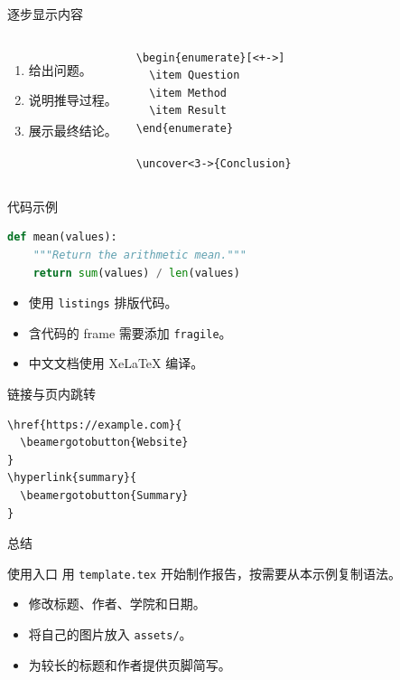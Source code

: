\documentclass{beamer}
\begin{document}
\begin{frame}[fragile]{逐步显示内容}
  \begin{columns}[T,onlytextwidth]
      \begin{enumerate}[<+->]
        \item 给出问题。
        \item 说明推导过程。
        \item 展示最终结论。
      \end{enumerate}
      \begin{lstlisting}[language={[LaTeX]TeX}]
\begin{enumerate}[<+->]
  \item Question
  \item Method
  \item Result
\end{enumerate}

\uncover<3->{Conclusion}
      \end{lstlisting}
  \end{columns}
\end{frame}

\begin{frame}[fragile]{代码示例}
  \begin{lstlisting}[language=Python,basicstyle=\ttfamily\small]
def mean(values):
    """Return the arithmetic mean."""
    return sum(values) / len(values)
  \end{lstlisting}
  \begin{itemize}
    \item 使用 \texttt{listings} 排版代码。
    \item 含代码的 frame 需要添加 \texttt{fragile}。
    \item 中文文档使用 XeLaTeX 编译。
  \end{itemize}
\end{frame}

\begin{frame}[fragile]{链接与页内跳转}
  \href{https://www.usts.edu.cn/}{}
  \quad
  \hyperlink{summary}{}
  \medskip
  \begin{lstlisting}[language={[LaTeX]TeX}]
\href{https://example.com}{
  \beamergotobutton{Website}
}
\hyperlink{summary}{
  \beamergotobutton{Summary}
}
  \end{lstlisting}
\end{frame}

\begin{frame}[label=summary]{总结}
  \begin{block}{使用入口}
    用 \texttt{template.tex} 开始制作报告，按需要从本示例复制语法。
  \end{block}
  \begin{itemize}
    \item 修改标题、作者、学院和日期。
    \item 将自己的图片放入 \texttt{assets/}。
    \item 为较长的标题和作者提供页脚简写。
  \end{itemize}
\end{frame}
\end{document}
